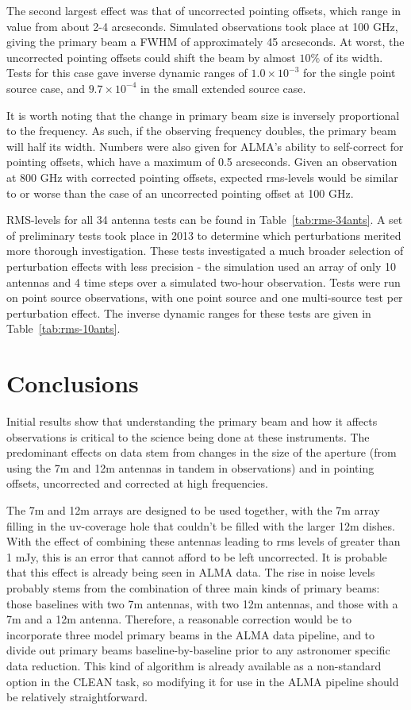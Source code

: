 \documentclass[11pt]{article}
\begin{document}
The second largest effect was that of uncorrected pointing offsets, which
range in value from about 2-4 arcseconds. Simulated observations took place
at 100 GHz, giving the primary beam a FWHM of approximately 45 arcseconds.
At worst, the uncorrected pointing offsets could shift the beam by almost
$10\%$ of its width. Tests for this case gave inverse dynamic ranges of $1.0 
\times 10^{-3}$ for the single point source case, and $9.7 \times 10^{-4}$ in 
the small extended source case.

It is worth noting that the change in primary beam size is inversely 
proportional to the frequency. As such, if the observing frequency doubles, the 
primary beam will half its width. Numbers were also given for ALMA's ability to
self-correct for pointing offsets, which have a maximum of 0.5 arcseconds.
Given an observation at 800 GHz with corrected pointing offsets, expected 
rms-levels would be similar to or worse than the case of an uncorrected 
pointing offset at 100 GHz.

RMS-levels for all 34 antenna tests can be found in Table~\ref{tab:rms-34ants}.  
A set of preliminary tests took place in 2013 to determine which perturbations 
merited more thorough investigation. These tests investigated a much broader 
selection of perturbation effects with less precision - the simulation used an 
array of only 10 antennas and 4 time steps over a simulated two-hour 
observation. Tests were run on point source observations, with one point source 
and one multi-source test per perturbation effect. The inverse dynamic ranges 
for these tests are given in Table~\ref{tab:rms-10ants}.

\section{Conclusions}

Initial results show that understanding the primary beam and how it affects
observations is critical to the science being done at these instruments. The
predominant effects on data stem from changes in the size of the aperture
(from using the 7m and 12m antennas in tandem in observations) and in
pointing offsets, uncorrected and corrected at high frequencies. 

The 7m and 12m arrays are designed to be used together, with the 7m array 
filling in the uv-coverage hole that couldn't be filled with the larger 12m 
dishes. With the effect of combining these antennas leading to rms levels of 
greater than 1 mJy, this is an error that cannot afford to be left uncorrected.  
It is probable that this effect is already being seen in ALMA data. The rise in
noise levels probably stems from the combination of three main kinds of
primary beams: those baselines with two 7m antennas, with two 12m
antennas, and those with a 7m and a 12m antenna. Therefore, a reasonable
correction would be to incorporate three model primary beams in the ALMA data 
pipeline, and to divide out primary beams baseline-by-baseline prior to any 
astronomer specific data reduction. This kind of algorithm is already available 
as a non-standard option in the CLEAN task, so modifying it for use in the ALMA 
pipeline should be relatively straightforward.
\end{document}
